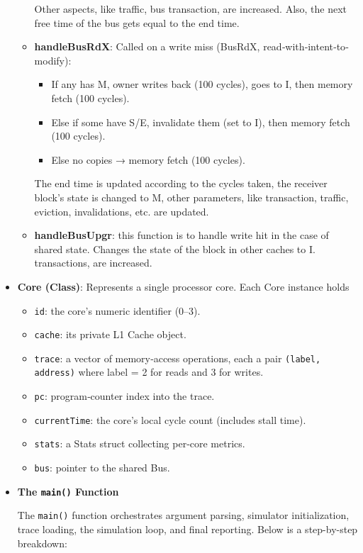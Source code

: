 \documentclass{article}
\begin{document}
\begin{itemize}
\begin{itemize}
\begin{itemize}
        \end{itemize}
        Other aspects, like traffic, bus transaction, are increased. Also, the next free time of the bus gets equal to the end time.
        \item \textbf{handleBusRdX}: Called on a write miss (BusRdX, read‐with‐intent‐to‐modify):
        \begin{itemize}
            \item If any has M, owner writes back (100 cycles), goes to I, then memory fetch (100 cycles).
            \item Else if some have S/E, invalidate them (set to I), then memory fetch (100 cycles).
            \item Else no copies → memory fetch (100 cycles).
        \end{itemize}
        The end time is updated according to the cycles taken, the receiver block's state is changed to M, other parameters, like transaction, traffic, eviction, invalidations, etc. are updated.
        \item \textbf{handleBusUpgr}: this function is to handle write hit in the case of shared state. Changes the state of the block in other caches to I.  transactions, are increased.
    \end{itemize}
    \item \textbf{Core (Class)}:  
    Represents a single processor core.  Each Core instance holds  
    \begin{itemize}
      \item \texttt{id}: the core’s numeric identifier (0–3).  
      \item \texttt{cache}: its private L1 Cache object.  
      \item \texttt{trace}: a vector of memory‐access operations, each a pair \texttt{(label, address)} where label = 2 for reads and 3 for writes.  
      \item \texttt{pc}: program‐counter index into the trace.  
      \item \texttt{currentTime}: the core’s local cycle count (includes stall time).  
      \item \texttt{stats}: a Stats struct collecting per‐core metrics.  
      \item \texttt{bus}: pointer to the shared Bus.  
    \end{itemize}
    \item \textbf{The \texttt{main()} Function}

The \texttt{main()} function orchestrates argument parsing, simulator initialization, trace loading, the simulation loop, and final reporting.  Below is a step-by-step breakdown:


\end{itemize}
\end{document}
